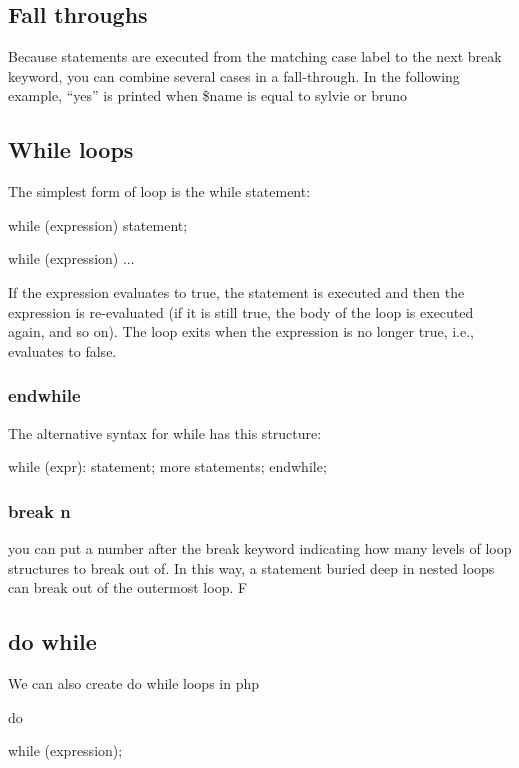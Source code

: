 \documentclass{report}
\begin{document}
\subsection{Fall throughs}
\bigbreak \noindent 
Because statements are executed from the matching case label to the next break keyword, you can combine several cases in a fall-through. In the following example, “yes” is printed when \$name is equal to sylvie or bruno
\bigbreak \noindent 
{}

\bigbreak \noindent 
\subsection{While loops}
\bigbreak \noindent 
The simplest form of loop is the while statement:
\bigbreak \noindent 
\begin{phpcode}
while (expression) statement;

while (expression) {
    ...
}
\end{phpcode}
\bigbreak \noindent 
If the expression evaluates to true, the statement is executed and then the expression
is re-evaluated (if it is still true, the body of the loop is executed again, and so on). The
loop exits when the expression is no longer true, i.e., evaluates to false.

\bigbreak \noindent 
\subsubsection{endwhile}
\bigbreak \noindent 
The alternative syntax for while has this structure:
\bigbreak \noindent 
\begin{phpcode}
    while (expr):
        statement;
        more statements;
    endwhile;
\end{phpcode}

\bigbreak \noindent 
\subsubsection{break n}
\bigbreak \noindent 
you can put a number after the break keyword indicating how many levels of loop structures to break out of. In this way, a statement buried deep in nested loops can break out of the outermost loop. F

\bigbreak \noindent 
\subsection{do while}
\bigbreak \noindent 
We can also create do while loops in php
\bigbreak \noindent 
\begin{phpcode}
    do {

    } while (expression);
\end{phpcode}
\end{document}
